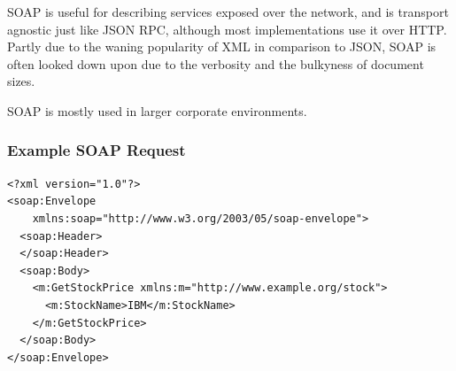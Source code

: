 \documentclass{book}
\begin{document}
SOAP is useful for describing services exposed over the network, and is transport agnostic just like JSON RPC, although most implementations use it over HTTP. Partly due to the waning popularity of XML in comparison to JSON, SOAP is often looked down upon due to the verbosity and the bulkyness of document sizes.

SOAP is mostly used in larger corporate environments.

\subsubsection{Example SOAP Request}

\begin{verbatim}
<?xml version="1.0"?>
<soap:Envelope
    xmlns:soap="http://www.w3.org/2003/05/soap-envelope">
  <soap:Header>
  </soap:Header>
  <soap:Body>
    <m:GetStockPrice xmlns:m="http://www.example.org/stock">
      <m:StockName>IBM</m:StockName>
    </m:GetStockPrice>
  </soap:Body>
</soap:Envelope>
\end{verbatim}
\end{document}
